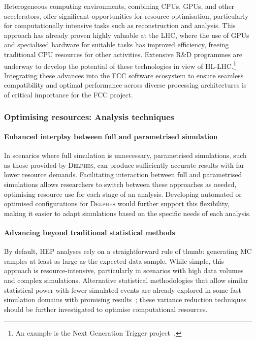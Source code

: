 Heterogeneous computing environments, combining CPUs, GPUs, and other accelerators, 
offer significant opportunities for resource optimisation, particularly for computationally intensive tasks such as reconstruction and analysis. 
This approach has already proven highly valuable at the LHC, where the use of GPUs and specialised hardware for suitable tasks has improved efficiency, 
freeing traditional CPU resources for other activities. 
Extensive R\&D programmes are underway to develop the potential of these technologies in view of 
HL-LHC.\footnote{An example is the Next Generation Trigger project~\cite{kickNGT}.} 
Integrating these advances into the FCC software ecosystem to ensure seamless compatibility and optimal performance 
across diverse processing architectures is of critical importance for the FCC project.  
    
\subsubsection{Optimising resources: Analysis techniques}

\paragraph{Enhanced interplay between full and parametrised simulation}

In scenarios where full simulation is unnecessary, parametrised simulations, such as those provided by \textsc{Delphes}, 
can produce sufficiently accurate results with far lower resource demands. 
Facilitating interaction between full and parametrised simulations allows researchers to switch between these approaches as needed, 
optimising resource use for each stage of an analysis. 
Developing automated or optimised configurations for \textsc{Delphes} would further support this flexibility, 
making it easier to adapt simulations based on the specific needs of each analysis.

\paragraph{Advancing beyond traditional statistical methods}

By default, HEP analyses rely on a straightforward rule of thumb: 
generating MC samples at least as large as the expected data sample. 
While simple, this approach is resource-intensive, particularly in scenarios with high data volumes and complex simulations. 
Alternative statistical methodologies that allow similar statistical power with fewer simulated events 
are already explored in some fast simulation domains with promising results~\cite{varred}; 
these variance reduction techniques should be further investigated to optimise computational resources.    

